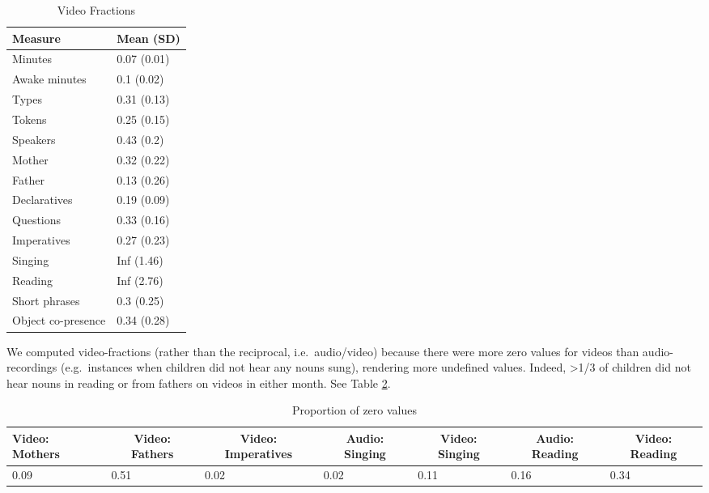 \documentclass[floatsintext,man]{apa6}
\theoremstyle{definition}
\theoremstyle{definition}
\theoremstyle{definition}
\theoremstyle{remark}
\begin{document}
\begin{table}[tbp]
\begin{center}
\begin{threeparttable}
\caption{\label{tab:vboost-table}Video Fractions}
\begin{tabular}{ll}
\toprule
Measure & \multicolumn{1}{c}{Mean (SD)}\\
\midrule
Minutes & 0.07 (0.01)\\
Awake minutes & 0.1 (0.02)\\
Types & 0.31 (0.13)\\
Tokens & 0.25 (0.15)\\
Speakers & 0.43 (0.2)\\
Mother & 0.32 (0.22)\\
Father & 0.13 (0.26)\\
Declaratives & 0.19 (0.09)\\
Questions & 0.33 (0.16)\\
Imperatives & 0.27 (0.23)\\
Singing & Inf (1.46)\\
Reading & Inf (2.76)\\
Short phrases & 0.3 (0.25)\\
Object co-presence & 0.34 (0.28)\\
\bottomrule
\end{tabular}
\end{threeparttable}
\end{center}
\end{table}

We computed video-fractions (rather than the reciprocal,
i.e.~audio/video) because there were more zero values for videos than
audio-recordings (e.g.~instances when children did not hear any nouns
sung), rendering more undefined values. Indeed, \textgreater{}1/3 of
children did not hear nouns in reading or from fathers on videos in
either month. See Table \ref{tab:propna-missing-tables}.

\begin{table}[tbp]
\begin{center}
\begin{threeparttable}
\caption{\label{tab:propna-missing-tables}Proportion of zero values}
\small{
\begin{tabular}{lllllll}
\toprule
Video: Mothers & \multicolumn{1}{c}{Video: Fathers} & \multicolumn{1}{c}{Video: Imperatives} & \multicolumn{1}{c}{Audio: Singing} & \multicolumn{1}{c}{Video: Singing} & \multicolumn{1}{c}{Audio: Reading} & \multicolumn{1}{c}{Video: Reading}\\
\midrule
0.09 & 0.51 & 0.02 & 0.02 & 0.11 & 0.16 & 0.34\\
\bottomrule
\end{tabular}
}
\end{threeparttable}
\end{center}
\end{table}
\end{document}
